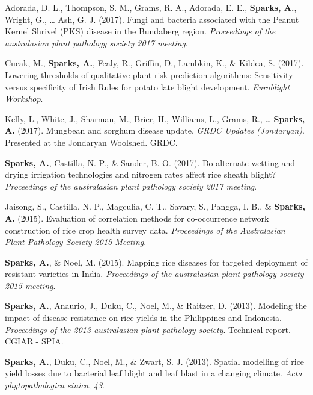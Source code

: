 \documentclass[11pt, a4paper]{awesome-cv}
\begin{document}
\leavevmode\hypertarget{ref-Adorada2017}{}%
Adorada, D. L., Thompson, S. M., Grams, R. A., Adorada, E. E., \textbf{Sparks, A.}, Wright, G., \ldots{} Ash, G. J. (2017). Fungi and bacteria associated with the Peanut Kernel Shrivel (PKS) disease in the Bundaberg region. \emph{Proceedings of the australasian plant pathology society 2017 meeting}.

\leavevmode\hypertarget{ref-Cucak2017}{}%
Cucak, M., \textbf{Sparks, A.}, Fealy, R., Griffin, D., Lambkin, K., \& Kildea, S. (2017). Lowering thresholds of qualitative plant risk prediction algorithms: Sensitivity versus specificity of Irish Rules for potato late blight development. \emph{Euroblight Workshop}.

\leavevmode\hypertarget{ref-Kelly2017}{}%
Kelly, L., White, J., Sharman, M., Brier, H., Williams, L., Grams, R., \ldots{} \textbf{Sparks, A.} (2017). Mungbean and sorghum disease update. \emph{GRDC Updates (Jondaryan)}. Presented at the Jondaryan Woolshed. GRDC.

\leavevmode\hypertarget{ref-Sparks2017b}{}%
\textbf{Sparks, A.}, Castilla, N. P., \& Sander, B. O. (2017). Do alternate wetting and drying irrigation technologies and nitrogen rates affect rice sheath blight? \emph{Proceedings of the australasian plant pathology society 2017 meeting}.

\leavevmode\hypertarget{ref-Jaisong2015}{}%
Jaisong, S., Castilla, N. P., Magculia, C. T., Savary, S., Pangga, I. B., \& \textbf{Sparks, A.} (2015). Evaluation of correlation methods for co-occurrence network construction of rice crop health survey data. \emph{Proceedings of the Australasian Plant Pathology Society 2015 Meeting}.

\leavevmode\hypertarget{ref-Sparks2015}{}%
\textbf{Sparks, A.}, \& Noel, M. (2015). Mapping rice diseases for targeted deployment of resistant varieties in India. \emph{Proceedings of the australasian plant pathology society 2015 meeting}.

\leavevmode\hypertarget{ref-Sparks2013}{}%
\textbf{Sparks, A.}, Anaurio, J., Duku, C., Noel, M., \& Raitzer, D. (2013). Modeling the impact of disease resistance on rice yields in the Philippines and Indonesia. \emph{Proceedings of the 2013 australasian plant pathology society}. Technical report. CGIAR - SPIA.

\leavevmode\hypertarget{ref-Sparks2013a}{}%
\textbf{Sparks, A.}, Duku, C., Noel, M., \& Zwart, S. J. (2013). Spatial modelling of rice yield losses due to bacterial leaf blight and leaf blast in a changing climate. \emph{Acta phytopathologica sinica}, \emph{43}.
\end{document}
